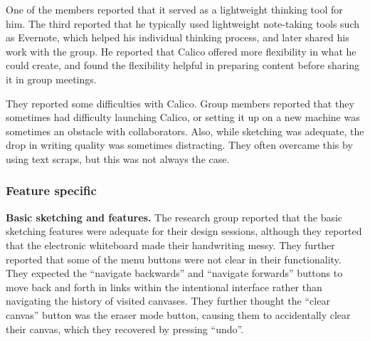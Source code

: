 One of the members reported that it served as a lightweight thinking tool for him. The third reported that he typically used lightweight note-taking tools such as Evernote, which helped his individual thinking process, and later shared his work with the group. He reported that Calico offered more flexibility in what he could create, and found the flexibility helpful in preparing content before sharing it in group meetings.


They reported some difficulties with Calico. Group members reported that they sometimes had difficulty launching Calico, or setting it up on a new machine was sometimes an obstacle with collaborators. Also, while sketching was adequate, the drop in writing quality was sometimes distracting. They often overcame this by using text scraps, but this was not always the case. 










\subsubsection{Feature specific}


\textbf{Basic sketching and features.} The research group reported that the basic sketching features were adequate for their design sessions, although they reported that the electronic whiteboard made their handwriting messy. They further reported that some of the menu buttons were not clear in their functionality. They expected the ``navigate backwards'' and ``navigate forwards'' buttons to move back and forth in links within the intentional interface rather than navigating the history of visited canvases. They further thought the ``clear canvas'' button was the eraser mode button, causing them to accidentally clear their canvas, which they recovered by pressing ``undo''.

